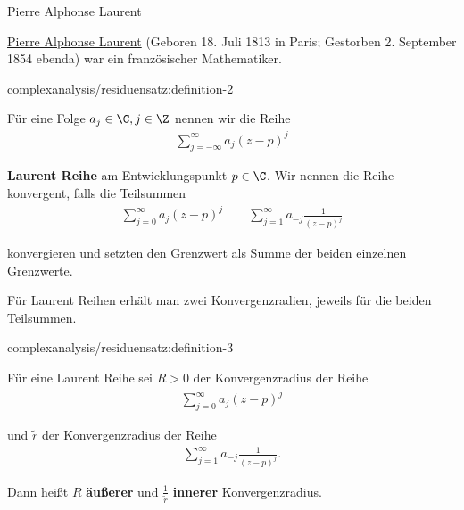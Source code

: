\documentclass[letterpaper,10pt,german]{jupyterBook}
\begin{document}
\begin{emphBox}{Pierre Alphonse Laurent}{}

\par
\href{https://de.wikipedia.org/wiki/Pierre\_Alphonse\_Laurent}{Pierre Alphonse Laurent} (Geboren 18. Juli 1813 in Paris; Gestorben 2. September 1854 ebenda) war ein französischer Mathematiker.
\end{emphBox}
\begin{definition}{}{complexanalysis/residuensatz:definition-2}



\par
Für eine Folge \(a_j\in\C, j\in \Z\) nennen wir die Reihe
\begin{align*}
\sum_{j=-\infty}^\infty a_j (z-p)^j
\end{align*}
\par
\textbf{Laurent Reihe} am Entwicklungspunkt \(p\in\C\). Wir nennen die Reihe konvergent, falls die Teilsummen
\begin{align*}
\sum_{j=0}^\infty a_j (z-p)^j\qquad \sum_{j=1}^\infty a_{-j} \frac{1}{(z-p)^j}
\end{align*}
\par
konvergieren und setzten den Grenzwert als Summe der beiden einzelnen Grenzwerte.
\end{definition}

\par
Für Laurent Reihen erhält man zwei Konvergenzradien, jeweils für die beiden Teilsummen.
\begin{definition}{}{complexanalysis/residuensatz:definition-3}



\par
Für eine Laurent Reihe sei \(R>0\) der Konvergenzradius der Reihe
\begin{align*}
\sum_{j=0}^\infty a_j (z-p)^j
\end{align*}
\par
und \(\tilde{r}\) der Konvergenzradius der Reihe
\begin{align*}
\sum_{j=1}^\infty a_{-j} \frac{1}{(z-p)^j}.
\end{align*}
\par
Dann heißt \(R\) \textbf{äußerer} und \(\frac{1}{\tilde{r}}\) \textbf{innerer} Konvergenzradius.
\end{definition}
\end{document}
